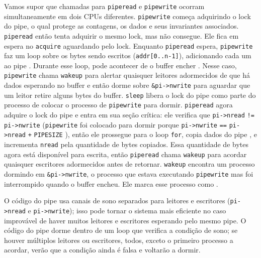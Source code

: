 {Vamos supor que chamadas para
\lstinline{piperead}
e
\lstinline{pipewrite}
ocorram simultaneamente em dois CPUs diferentes.
\lstinline{pipewrite}
começa adquirindo o lock do pipe, o qual
protege as contagens, os dados e seus
invariantes associados.
\lstinline{piperead}
então tenta adquirir o mesmo lock, mas não consegue.
Ele fica em espera no
\lstinline{acquire}
aguardando pelo lock.
Enquanto
\lstinline{piperead}
espera,
\lstinline{pipewrite}
faz um loop sobre os bytes sendo escritos
(\lstinline{addr[0..n-1]}),
adicionando cada um ao pipe
.
Durante esse loop, pode acontecer de
o buffer encher
.
Nesse caso,
\lstinline{pipewrite}
chama
\lstinline{wakeup}
para alertar quaisquer leitores adormecidos de que
há dados esperando no buffer
e então dorme sobre
\lstinline{&pi->nwrite}
para aguardar que um leitor retire alguns bytes
do buffer.
\lstinline{sleep}
libera
o lock do pipe
como parte do processo de colocar
o processo de
\lstinline{pipewrite}
para dormir.
\lstinline{piperead}
agora adquire o lock do pipe e entra em sua seção crítica:
ele verifica que
\lstinline{pi->nread}
\lstinline{!=}
\lstinline{pi->nwrite}
(\lstinline{pipewrite}
foi colocado para dormir porque
\lstinline{pi->nwrite}
\lstinline{==}
\lstinline{pi->nread}
\lstinline{+}
\lstinline{PIPESIZE}
),
então ele prossegue para o loop
\lstinline{for}, copia dados do pipe
,
e incrementa
\lstinline{nread}
pela quantidade de bytes copiados.
Essa quantidade de bytes agora está disponível para escrita, então
\lstinline{piperead}
chama
\lstinline{wakeup}
para acordar quaisquer escritores adormecidos
antes de retornar.
\lstinline{wakeup}
encontra um processo dormindo em
\lstinline{&pi->nwrite},
o processo que estava executando
\lstinline{pipewrite}
mas foi interrompido quando o buffer encheu.
Ele marca esse processo como
.

O código do pipe usa canais de sono separados para leitores e escritores
(\lstinline{pi->nread}
e
\lstinline{pi->nwrite});
isso pode tornar o sistema mais eficiente no caso improvável
de haver muitos
leitores e escritores esperando pelo mesmo pipe.
O código do pipe dorme dentro de um loop que verifica a
condição de sono; se houver múltiplos leitores
ou escritores, todos, exceto o primeiro processo a acordar,
verão que a condição ainda é falsa e voltarão a dormir.

}
